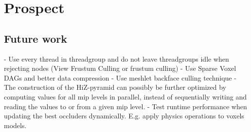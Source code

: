 \chapter{Prospect} \label{cpt-prospect}



\section{Future work}

- Use every thread in threadgroup and do not leave threadgroups idle when rejecting nodes (View Frustum Culling or frustum culling)
- Use Sparse Voxel DAGs and better data compression
- Use meshlet backface culling technique
- The construction of the \ac{HiZ}-pyramid can possibly be further optimized by computing values for all mip levels 
  in parallel, instead of sequentially writing and reading the values to or from a given mip level. 
- Test runtime performance when updating the best occluders dynamically. E.g. apply physics operations to voxels models.